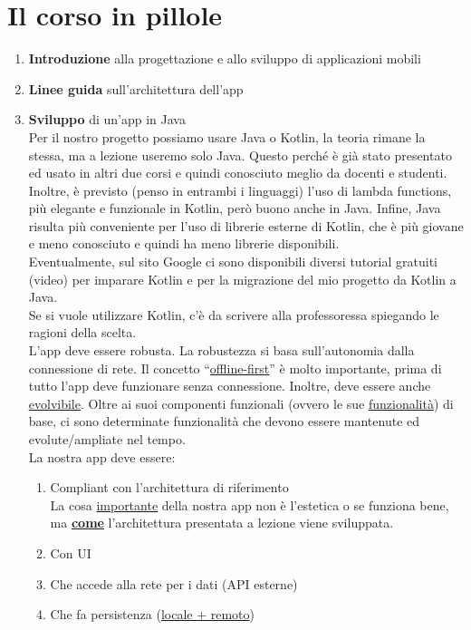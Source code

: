 \section{Il corso in pillole}
\begin{enumerate}
    \item \textbf{Introduzione} alla progettazione e allo sviluppo di applicazioni mobili
    \item \textbf{Linee guida} sull'architettura dell'app
    \item \textbf{Sviluppo} di un'app in Java\\
    Per il nostro progetto possiamo usare Java o Kotlin, la teoria rimane la stessa, ma a lezione useremo solo Java. Questo perché è già stato presentato ed usato in altri due corsi e quindi conosciuto meglio da docenti e studenti. Inoltre, è previsto (penso in entrambi i linguaggi) l'uso di lambda functions, più elegante e funzionale in Kotlin, però buono anche in Java. Infine, Java risulta più conveniente per l'uso di librerie esterne di Kotlin, che è più giovane e meno conosciuto e quindi ha meno librerie disponibili.\\
    Eventualmente, sul sito Google ci sono disponibili diversi tutorial gratuiti (video) per imparare Kotlin e per la migrazione del mio progetto da Kotlin a Java.\\
    Se si vuole utilizzare Kotlin, c'è da scrivere alla professoressa spiegando le ragioni della scelta.\\
    L'app deve essere robusta. La robustezza si basa sull'autonomia dalla connessione di rete. Il concetto ``\underline{offline-first}'' è molto importante, prima di tutto l'app deve funzionare senza connessione. Inoltre, deve essere anche \underline{evolvibile}. Oltre ai suoi componenti funzionali (ovvero le sue \underline{funzionalità}) di base, ci sono determinate funzionalità che devono essere mantenute ed evolute/ampliate nel tempo.\\
    La nostra app deve essere:
    \begin{enumerate}
        \item Compliant con l'architettura di riferimento\\
        La cosa \underline{importante} della nostra app non è l'estetica o se funziona bene, ma \textbf{\underline{come}} l'architettura presentata a lezione viene sviluppata.
        \item Con UI
        \item Che accede alla rete per i dati (API esterne)
        \item Che fa persistenza (\underline{locale + remoto})\\

\end{enumerate}
\end{enumerate}
